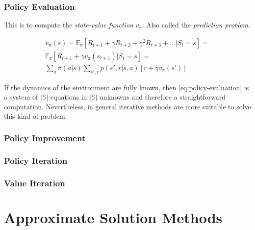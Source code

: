 \documentclass[paper=a4,fontsize=11pt]{scrartcl} %
\numberwithin{equation}{section} %
\numberwithin{figure}{section} %
\numberwithin{table}{section} %
\begin{document}
\subsubsection{Policy Evaluation}

This is to compute the \textit{state-value function} $v_\pi$. 
Also called the \textit{prediction problem}.

\begin{equation}
    \begin{aligned}
        v_\pi(s) = \mathbb{E_\pi} \left[ 
            R_{t+1} + \gamma R_{t+2} + \gamma^2 R_{t+3} + ... | S_t = s
        \right] = \\ 
        \mathbb{E_\pi} \left[ 
            R_{t+1} + \gamma v_\pi(s_{t+1}) | S_t = s
        \right] = \\
        \sum_a \pi(a|s) \sum_{s',r} p(s',r|s, a) \left[ r + \gamma v_\pi(s') \right]
    \end{aligned}
    \label{eq:policy-evaluation}
\end{equation}

If the dynamics of the environment are fully known, then \ref{eq:policy-evaluation}
is a system of $|\mathbb{S}|$ equations in $|\mathbb{S}|$ unknowns and therefore
a straightforward computation. Nevertheless, in general iterative methods are more 
suitable to solve this kind of problem.

\subsubsection{Policy Improvement}

\subsubsection{Policy Iteration}

\subsubsection{Value Iteration}




\section{Approximate Solution Methods}
\end{document}

